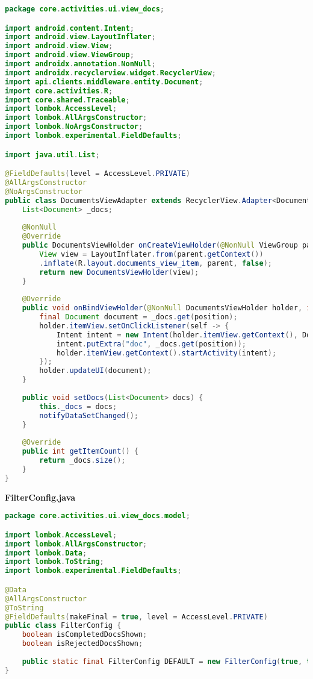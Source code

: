 \begin{lstlisting}[language=Java]
package core.activities.ui.view_docs;

import android.content.Intent;
import android.view.LayoutInflater;
import android.view.View;
import android.view.ViewGroup;
import androidx.annotation.NonNull;
import androidx.recyclerview.widget.RecyclerView;
import api.clients.middleware.entity.Document;
import core.activities.R;
import core.shared.Traceable;
import lombok.AccessLevel;
import lombok.AllArgsConstructor;
import lombok.NoArgsConstructor;
import lombok.experimental.FieldDefaults;

import java.util.List;

@FieldDefaults(level = AccessLevel.PRIVATE)
@AllArgsConstructor
@NoArgsConstructor
public class DocumentsViewAdapter extends RecyclerView.Adapter<DocumentsViewHolder> implements Traceable {
	List<Document> _docs;
	
	@NonNull
	@Override
	public DocumentsViewHolder onCreateViewHolder(@NonNull ViewGroup parent, int viewType) {
		View view = LayoutInflater.from(parent.getContext())
		.inflate(R.layout.documents_view_item, parent, false);
		return new DocumentsViewHolder(view);
	}
	
	@Override
	public void onBindViewHolder(@NonNull DocumentsViewHolder holder, int position) {
		final Document document = _docs.get(position);
		holder.itemView.setOnClickListener(self -> {
			Intent intent = new Intent(holder.itemView.getContext(), DocViewActivity.class);
			intent.putExtra("doc", _docs.get(position));
			holder.itemView.getContext().startActivity(intent);
		});
		holder.updateUI(document);
	}
	
	public void setDocs(List<Document> docs) {
		this._docs = docs;
		notifyDataSetChanged();
	}
	
	@Override
	public int getItemCount() {
		return _docs.size();
	}
}

\end{lstlisting}
\textbf{FilterConfig.java}
\begin{lstlisting}[language=Java]
package core.activities.ui.view_docs.model;

import lombok.AccessLevel;
import lombok.AllArgsConstructor;
import lombok.Data;
import lombok.ToString;
import lombok.experimental.FieldDefaults;

@Data
@AllArgsConstructor
@ToString
@FieldDefaults(makeFinal = true, level = AccessLevel.PRIVATE)
public class FilterConfig {
	boolean isCompletedDocsShown;
	boolean isRejectedDocsShown;
	
	public static final FilterConfig DEFAULT = new FilterConfig(true, true);
}

\end{lstlisting}
